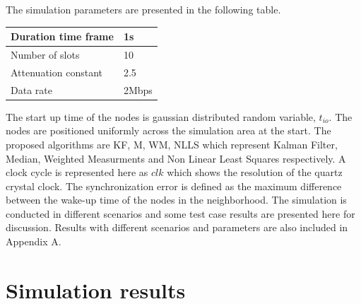 \documentclass[a4paper,10pt]{report}
\begin{document}
The simulation parameters are presented in the following table.
\begin{center}
    \begin{tabular}{ | l | l |}
    \hline
    Duration time frame & 1s \\ \hline
    Number of slots &  10 \\ \hline
    Attenuation constant & 2.5 \\ \hline
    Data rate &  2Mbps \\ \hline
    \end{tabular}
\end{center}
The start up time of the nodes is gaussian distributed random variable, $t_{io}$. The nodes are positioned uniformly across the simulation area at the start. The proposed algorithms are KF, M, WM, NLLS which represent Kalman Filter, Median, Weighted Measurments and Non Linear Least Squares respectively. A clock cycle is represented here as $clk$ which shows the resolution of the quartz crystal clock. The synchronization error is defined as the maximum difference between the wake-up time of the nodes in the neighborhood. The simulation is conducted in different scenarios and some test case results are presented here for discussion. Results with different scenarios and parameters are also included in Appendix A.
\section{\textbf{Simulation results}}
\end{document}
